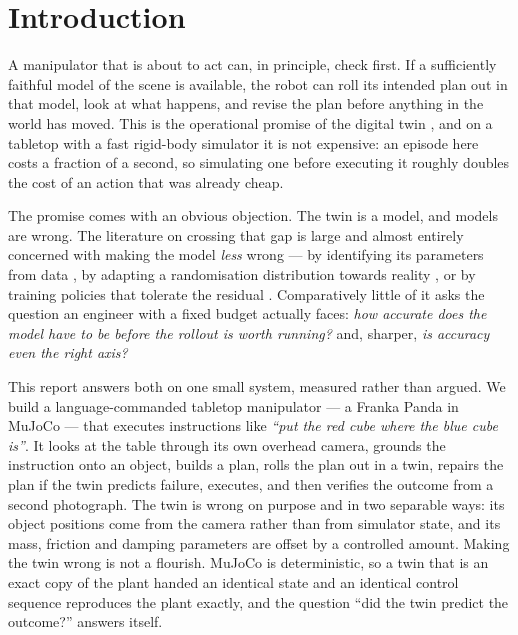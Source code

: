 \documentclass[11pt,a4paper]{article}
\begin{document}
\section{Introduction}

A manipulator that is about to act can, in principle, check first. If a
sufficiently faithful model of the scene is available, the robot can roll its
intended plan out in that model, look at what happens, and revise the plan
before anything in the world has moved. This is the operational promise of the
digital twin \citep{grieves2017digital,jones2020characterising}, and on a
tabletop with a fast rigid-body simulator it is not expensive: an episode here
costs a fraction of a second, so simulating one before executing it roughly
doubles the cost of an action that was already cheap.

The promise comes with an obvious objection. The twin is a model, and models are
wrong. The literature on crossing that gap is large and almost entirely
concerned with making the model \emph{less} wrong --- by identifying its
parameters from data \citep{gautier1992exciting,swevers2007dynamic}, by adapting
a randomisation distribution towards reality \citep{chebotar2019closing,
ramos2019bayessim}, or by training policies that tolerate the residual
\citep{tobin2017domain,peng2018sim,muratore2022robot}. Comparatively little of
it asks the question an engineer with a fixed budget actually faces: \emph{how
accurate does the model have to be before the rollout is worth running?} and,
sharper, \emph{is accuracy even the right axis?}

This report answers both on one small system, measured rather than argued. We
build a language-commanded tabletop manipulator --- a Franka Panda in MuJoCo
\citep{todorov2012mujoco} --- that executes instructions like \emph{``put the red
cube where the blue cube is''}. It looks at the table through its own overhead
camera, grounds the instruction onto an object, builds a plan, rolls the plan out
in a twin, repairs the plan if the twin predicts failure, executes, and then
verifies the outcome from a second photograph. The twin is wrong on purpose and
in two separable ways: its object positions come from the camera rather than from
simulator state, and its mass, friction and damping parameters are offset by a
controlled amount. Making the twin wrong is not a flourish. MuJoCo is
deterministic, so a twin that is an exact copy of the plant handed an identical
state and an identical control sequence reproduces the plant exactly, and the
question ``did the twin predict the outcome?'' answers itself.
\end{document}
